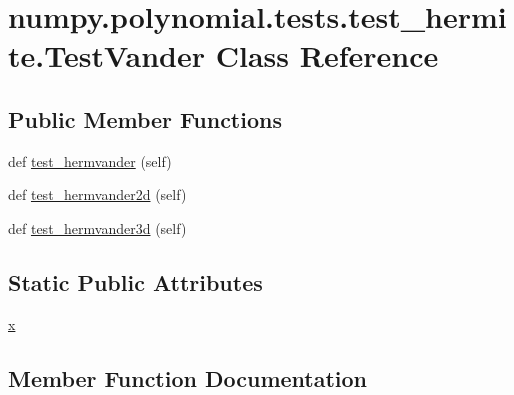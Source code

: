 \hypertarget{classnumpy_1_1polynomial_1_1tests_1_1test__hermite_1_1TestVander}{}\section{numpy.\+polynomial.\+tests.\+test\+\_\+hermite.\+Test\+Vander Class Reference}
\label{classnumpy_1_1polynomial_1_1tests_1_1test__hermite_1_1TestVander}
\subsection*{Public Member Functions}
\begin{DoxyCompactItemize}
\item 
def \hyperlink{classnumpy_1_1polynomial_1_1tests_1_1test__hermite_1_1TestVander_a24d7f6a825bdfe62e1f146fc4663de57}{test\+\_\+hermvander} (self)
\item 
def \hyperlink{classnumpy_1_1polynomial_1_1tests_1_1test__hermite_1_1TestVander_a37c34c23320a952708786c246c6f813e}{test\+\_\+hermvander2d} (self)
\item 
def \hyperlink{classnumpy_1_1polynomial_1_1tests_1_1test__hermite_1_1TestVander_a9c660f681098034e78075b25bd86ccf0}{test\+\_\+hermvander3d} (self)
\end{DoxyCompactItemize}
\subsection*{Static Public Attributes}
\begin{DoxyCompactItemize}
\item 
\hyperlink{classnumpy_1_1polynomial_1_1tests_1_1test__hermite_1_1TestVander_a8e5f96f624f1a6057a2241ce94c8aee5}{x}
\end{DoxyCompactItemize}


\subsection{Member Function Documentation}
\mbox{\label{classnumpy_1_1polynomial_1_1tests_1_1test__hermite_1_1TestVander_a24d7f6a825bdfe62e1f146fc4663de57}} 
